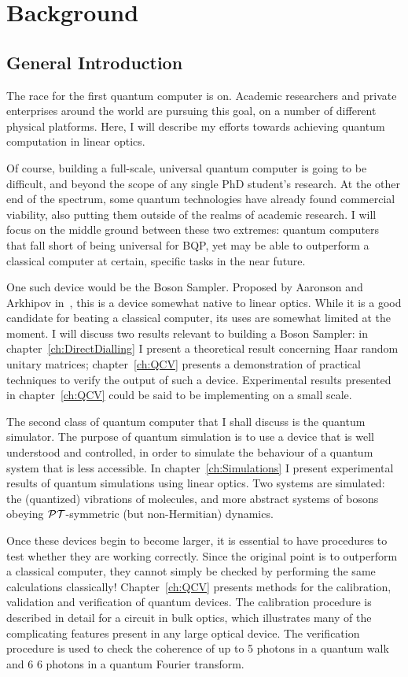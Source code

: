 \chapter{Background}
\label{ch:Introduction}
\section{General Introduction}
\label{sec:Science}
The race for the first quantum computer is on. Academic researchers and private
enterprises around the world are pursuing this goal, on a number of different
physical platforms. Here, I will describe my efforts towards achieving quantum
computation in linear optics.

Of course, building a full-scale, universal quantum computer is going to be
difficult, and beyond the scope of any single PhD student's research. At the
other end of the spectrum, some quantum technologies have already found
commercial viability, also putting them outside of the realms of academic
research. I will focus on the middle ground between these two extremes: quantum
computers that fall short of being universal for BQP, yet may be able to
outperform a classical computer at certain, specific tasks in the near future.

One such device would be the Boson Sampler. Proposed by Aaronson and Arkhipov
in~\cite{bosonsampling}, this is a device somewhat native to linear optics.
While it is
a good candidate for beating a classical computer, its uses are somewhat limited
at the moment. I will discuss two results relevant to building a Boson Sampler:
in chapter~\ref{ch:DirectDialling} I present a theoretical result concerning
Haar random unitary matrices; chapter~\ref{ch:QCV} presents a demonstration of
practical techniques to verify the output of such a device. Experimental results
presented in chapter~\ref{ch:QCV} could be said to be implementing
\bosonsampling{} on a small scale.

The second class of quantum computer that I shall discuss is the quantum
simulator. The purpose of quantum simulation is to use a device that is well
understood and controlled, in order to simulate the behaviour of a quantum
system that is less accessible. In chapter~\ref{ch:Simulations} I present
experimental results of quantum simulations using linear optics. Two systems are
simulated: the (quantized) vibrations of molecules, and more abstract systems of
bosons obeying \(\mathcal{PT}\)-symmetric (but non-Hermitian) dynamics.

Once these devices begin to become larger, it is essential to have procedures to
test whether they are working correctly. Since the original point is to
outperform a classical computer, they cannot simply be checked by performing the
same calculations classically! Chapter~\ref{ch:QCV} presents methods for the
calibration, validation and verification of quantum devices. The calibration
procedure is described in detail for a circuit in bulk optics, which illustrates
many of the complicating features present in any large optical device. The
verification procedure is used to check the coherence  of up to 5 photons in a quantum walk and 6
6 photons in a quantum Fourier transform.

